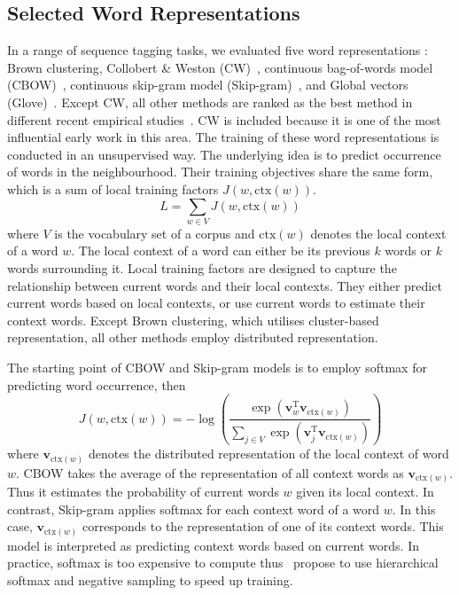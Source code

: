 \subsection{Selected Word Representations}
In a range of sequence tagging tasks, we evaluated five word representations : Brown clustering, Collobert \& Weston (CW)~\cite{collobert2011natural}, continuous bag-of-words model (CBOW)~\cite{Mikolov13}, continuous skip-gram model (Skip-gram)~\cite{Mikolov13NIPS}, and Global vectors (Glove)~\cite{pennington2014glove}. Except CW, all other methods are ranked as the best method in different recent empirical studies~\cite{turian2010word,pennington2014glove}. CW is included because it is one of the most influential early work in this area. The training of these word representations is conducted in an unsupervised way. The underlying idea is to predict occurrence of words in the neighbourhood. Their training objectives share the same form, which is a sum of local training factors $J(w, \text{ctx}(w))$. 
\begin{displaymath}
L = \sum_{w \in V} J(w, \text{ctx}(w))
\end{displaymath}
where $V$ is the vocabulary set of a corpus and $\text{ctx}(w)$ denotes the local context of a word $w$. The local context of a word can either be its previous $k$ words or $k$ words surrounding it. Local training factors are designed to capture the relationship between current words and their local contexts. They either predict current words based on local contexts, or use current words to estimate their context words. Except Brown clustering, which utilises cluster-based representation, all other methods employ distributed representation.

The starting point of CBOW and Skip-gram models is to employ softmax for predicting word occurrence, then
\begin{displaymath}
J(w, \text{ctx}(w)) = - \log \left( \frac{\exp(\mathbf{v}_w^{\text{T}} \mathbf{v}_{\text{ctx}(w)})}{ \sum_{j \in V} \exp(\mathbf{v}_j^{\text{T}} \mathbf{v}_{\text{ctx}(w)})} \right)
\end{displaymath}
where $\mathbf{v}_{\text{ctx}(w)}$ denotes the distributed representation of the local context of word $w$. CBOW takes the average of the representation of all context words as $\mathbf{v}_{\text{ctx}(w)}$. Thus it estimates the probability of current words $w$ given its local context. In contrast, Skip-gram applies softmax for each context word of a word $w$. In this case, $\mathbf{v}_{\text{ctx}(w)}$ corresponds to the representation of one of its context words. This model is interpreted as predicting context words based on current words. In practice, softmax is too expensive to compute thus~ propose to use hierarchical softmax and negative sampling to speed up training.

